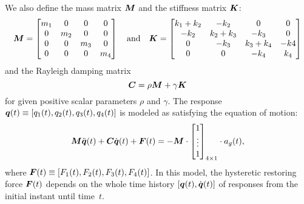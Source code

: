 We also define the mass matrix $\mbox{\boldmath$ M $}$ and the stiffness matrix $\mbox{\boldmath$ K $}$:
\begin{equation*}
\bv{M}=
\begin{bmatrix}
  m_1 & 0   & 0   & 0 \\
  0   & m_2 & 0   & 0 \\
  0   & 0   & m_3 & 0 \\
  0   & 0   & 0   & m_4 \\
\end{bmatrix}
%
\quad \text{and} \quad
%
\bv{K}=
\begin{bmatrix}
  k_1 + k_2 & -k_2    & 0       & 0 \\
  -k_2      & k_2+k_3 & -k_3    & 0 \\
  0         & -k_3    & k_3+k_4 & -k4 \\
  0         &   0     & -k_4    & k_4 \\
\end{bmatrix}
\end{equation*}
and the Rayleigh damping matrix
\begin{equation*}
\mbox{\boldmath$ C $} = \rho \mbox{\boldmath$ M $} + \gamma \mbox{\boldmath$ K $}
\end{equation*}
for given positive scalar parameters $\rho$ and $\gamma$. The response $\mbox{\boldmath$ q $}(t) \equiv [q_1(t),q_2(t),q_3(t),q_4(t)]$ is modeled as satisfying the equation of motion:
\begin{equation}\label{eq:hyst:motion}
\mbox{\boldmath$ M $} \ddot{\mbox{\boldmath$ q $}}(t) + \mbox{\boldmath$ C $} \dot{\mbox{\boldmath$ q $}}(t) + \mbox{\boldmath$ F $}(t) = -\mbox{\boldmath$ M $}\cdot
\begin{bmatrix}
1 \\
\vdots \\
1
\end{bmatrix}_{4\times1} \cdot a_g(t),
\end{equation}
where $\mbox{\boldmath$ F $}(t) \equiv [F_1(t), F_2(t), F_3(t), F_4(t)]$. In this model, the hysteretic restoring force $\mbox{\boldmath$ F $}(t)$ depends on the whole
time history $[\mbox{\boldmath$ q $}(t),\dot{\mbox{\boldmath$ q $}}(t)]$ of responses from the initial instant until time~$t$.


